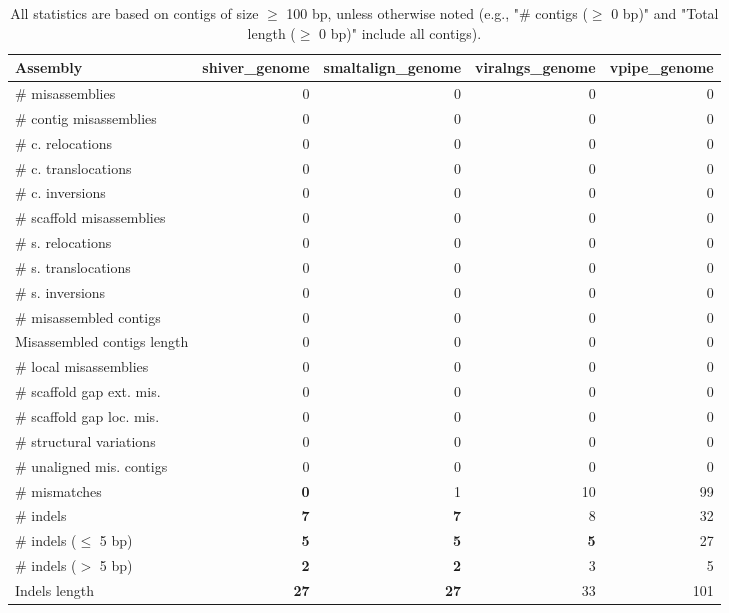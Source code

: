 \documentclass[12pt,a4paper]{article}
\begin{document}
\begin{table}[ht]
\begin{center}
\caption{All statistics are based on contigs of size $\geq$ 100 bp, unless otherwise noted (e.g., "\# contigs ($\geq$ 0 bp)" and "Total length ($\geq$ 0 bp)" include all contigs).}
\begin{tabular}{|l*{4}{|r}|}
\hline
Assembly & shiver\_genome & smaltalign\_genome & viralngs\_genome & vpipe\_genome \\ \hline
\# misassemblies & 0 & 0 & 0 & 0 \\ \hline
\hspace{2mm}\# contig misassemblies & 0 & 0 & 0 & 0 \\ \hline
\hspace{5mm}\# c. relocations & 0 & 0 & 0 & 0 \\ \hline
\hspace{5mm}\# c. translocations & 0 & 0 & 0 & 0 \\ \hline
\hspace{5mm}\# c. inversions & 0 & 0 & 0 & 0 \\ \hline
\hspace{2mm}\# scaffold misassemblies & 0 & 0 & 0 & 0 \\ \hline
\hspace{5mm}\# s. relocations & 0 & 0 & 0 & 0 \\ \hline
\hspace{5mm}\# s. translocations & 0 & 0 & 0 & 0 \\ \hline
\hspace{5mm}\# s. inversions & 0 & 0 & 0 & 0 \\ \hline
\# misassembled contigs & 0 & 0 & 0 & 0 \\ \hline
Misassembled contigs length & 0 & 0 & 0 & 0 \\ \hline
\# local misassemblies & 0 & 0 & 0 & 0 \\ \hline
\# scaffold gap ext. mis. & 0 & 0 & 0 & 0 \\ \hline
\# scaffold gap loc. mis. & 0 & 0 & 0 & 0 \\ \hline
\# structural variations & 0 & 0 & 0 & 0 \\ \hline
\# unaligned mis. contigs & 0 & 0 & 0 & 0 \\ \hline
\# mismatches & {\bf 0} & 1 & 10 & 99 \\ \hline
\# indels & {\bf 7} & {\bf 7} & 8 & 32 \\ \hline
\hspace{5mm}\# indels ($\leq$ 5 bp) & {\bf 5} & {\bf 5} & {\bf 5} & 27 \\ \hline
\hspace{5mm}\# indels ($>$ 5 bp) & {\bf 2} & {\bf 2} & 3 & 5 \\ \hline
Indels length & {\bf 27} & {\bf 27} & 33 & 101 \\ \hline
\end{tabular}
\end{center}
\end{table}
\end{document}
